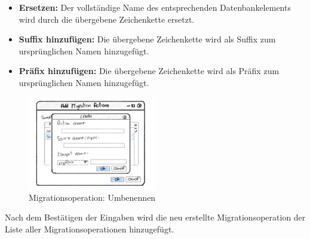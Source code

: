 \begin{itemize}
	\item \textbf{Ersetzen:} Der vollständige Name des entsprechenden Datenbankelements wird durch die übergebene Zeichenkette ersetzt.
	\item \textbf{Suffix hinzufügen:} Die übergebene Zeichenkette wird als Suffix zum ursprünglichen Namen hinzugefügt.
	\item \textbf{Präfix hinzufügen:} Die übergebene Zeichenkette wird als Präfix zum ursprünglichen Namen hinzugefügt.
\end{itemize}
\begin{figure}[H]
	\centering
	\includegraphics[width=0.5\textwidth]{images/add-rename-action}
	\caption{Migrationsoperation: Umbenennen}
	\label{img:add-rename-action}
\end{figure}
Nach dem Bestätigen der Eingaben wird die neu erstellte Migrationsoperation der Liste aller Migrationsoperationen hinzugefügt.

